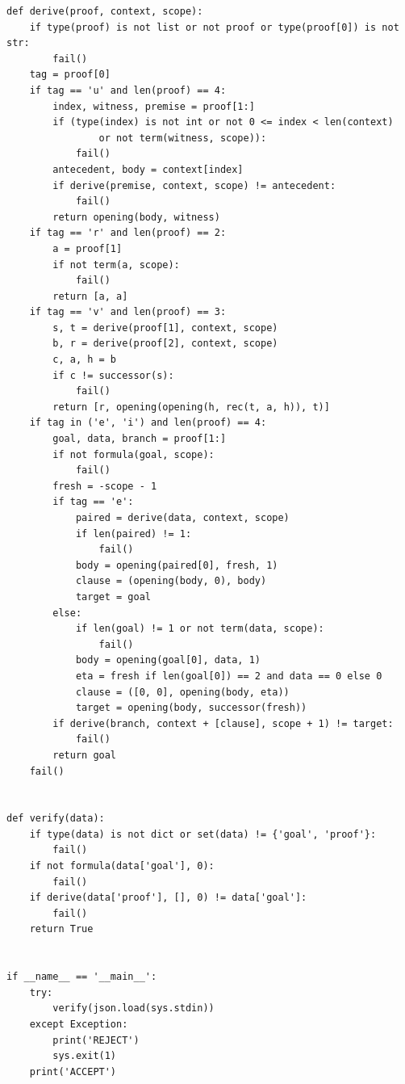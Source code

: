 \documentclass[11pt,letterpaper]{article}
\theoremstyle{definition}
\begin{document}
\begin{lstlisting}
def derive(proof, context, scope):
    if type(proof) is not list or not proof or type(proof[0]) is not str:
        fail()
    tag = proof[0]
    if tag == 'u' and len(proof) == 4:
        index, witness, premise = proof[1:]
        if (type(index) is not int or not 0 <= index < len(context)
                or not term(witness, scope)):
            fail()
        antecedent, body = context[index]
        if derive(premise, context, scope) != antecedent:
            fail()
        return opening(body, witness)
    if tag == 'r' and len(proof) == 2:
        a = proof[1]
        if not term(a, scope):
            fail()
        return [a, a]
    if tag == 'v' and len(proof) == 3:
        s, t = derive(proof[1], context, scope)
        b, r = derive(proof[2], context, scope)
        c, a, h = b
        if c != successor(s):
            fail()
        return [r, opening(opening(h, rec(t, a, h)), t)]
    if tag in ('e', 'i') and len(proof) == 4:
        goal, data, branch = proof[1:]
        if not formula(goal, scope):
            fail()
        fresh = -scope - 1
        if tag == 'e':
            paired = derive(data, context, scope)
            if len(paired) != 1:
                fail()
            body = opening(paired[0], fresh, 1)
            clause = (opening(body, 0), body)
            target = goal
        else:
            if len(goal) != 1 or not term(data, scope):
                fail()
            body = opening(goal[0], data, 1)
            eta = fresh if len(goal[0]) == 2 and data == 0 else 0
            clause = ([0, 0], opening(body, eta))
            target = opening(body, successor(fresh))
        if derive(branch, context + [clause], scope + 1) != target:
            fail()
        return goal
    fail()


def verify(data):
    if type(data) is not dict or set(data) != {'goal', 'proof'}:
        fail()
    if not formula(data['goal'], 0):
        fail()
    if derive(data['proof'], [], 0) != data['goal']:
        fail()
    return True


if __name__ == '__main__':
    try:
        verify(json.load(sys.stdin))
    except Exception:
        print('REJECT')
        sys.exit(1)
    print('ACCEPT')
\end{lstlisting}
\end{document}

